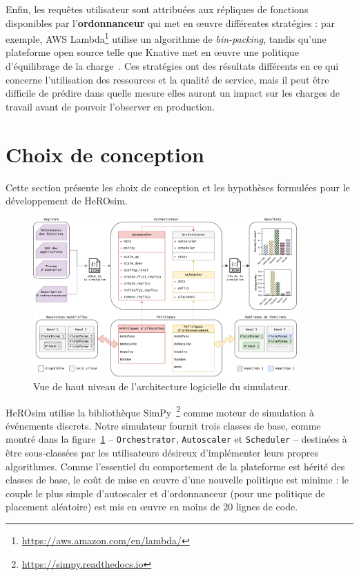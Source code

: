 Enfin, les requêtes utilisateur sont attribuées aux répliques de fonctions disponibles par l'\textbf{ordonnanceur} qui met en œuvre différentes stratégies : par exemple, \gls{AWS} Lambda\footnote{\href{https://aws.amazon.com/en/lambda/}{https://aws.amazon.com/en/lambda/}} utilise un algorithme de \textit{bin-packing}, tandis qu'une plateforme open source telle que Knative met en œuvre une politique d'équilibrage de la charge~\cite{Lannurien2023}. Ces stratégies ont des résultats différents en ce qui concerne l'utilisation des ressources et la qualité de service, mais il peut être difficile de prédire dans quelle mesure elles auront un impact sur les charges de travail avant de pouvoir l'observer en production.

\section{Choix de conception}
\label{section:herosim-herosim}

Cette section présente les choix de conception et les hypothèses formulées pour le développement de HeROsim.

\begin{figure}[!ht]
    \centering
    \includegraphics[width=0.9\textwidth]{6_Chapitre6/figures/software-architecture.png}
    \caption{Vue de haut niveau de l'architecture logicielle du simulateur.}
\label{figure:herosim-software-architecture}
\end{figure}

HeROsim utilise la bibliothèque SimPy~\footnote{\href{https://simpy.readthedocs.io}{https://simpy.readthedocs.io}} comme moteur de simulation à événements discrets. Notre simulateur fournit trois classes de base, comme montré dans la figure~\ref{figure:herosim-software-architecture} -- \texttt{Orchestrator}, \texttt{Autoscaler} et \texttt{Scheduler} -- destinées à être sous-classées par les utilisateurs désireux d'implémenter leurs propres algorithmes. Comme l'essentiel du comportement de la plateforme est hérité des classes de base, le coût de mise en œuvre d'une nouvelle politique est minime : le couple le plus simple d'autoscaler et d'ordonnanceur (pour une politique de placement aléatoire) est mis en œuvre en moins de 20 lignes de code.

